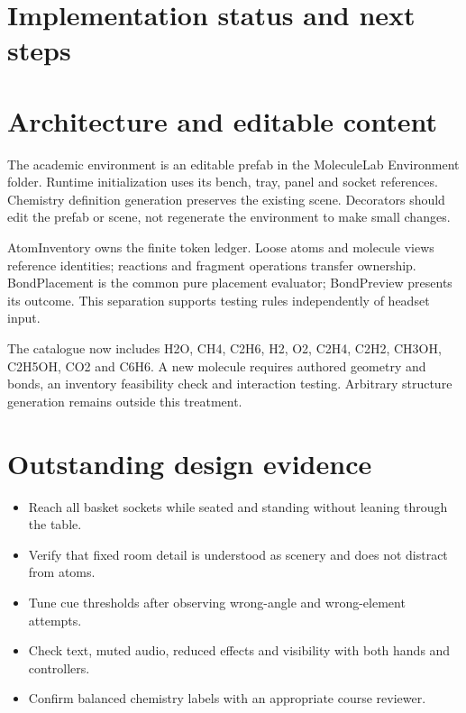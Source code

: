 \section*{Implementation status and next steps}


\section*{Architecture and editable content}
The academic environment is an editable prefab in the MoleculeLab Environment folder. Runtime initialization uses its bench, tray, panel and socket references. Chemistry definition generation preserves the existing scene. Decorators should edit the prefab or scene, not regenerate the environment to make small changes.

AtomInventory owns the finite token ledger. Loose atoms and molecule views reference identities; reactions and fragment operations transfer ownership. BondPlacement is the common pure placement evaluator; BondPreview presents its outcome. This separation supports testing rules independently of headset input.

The catalogue now includes H2O, CH4, C2H6, H2, O2, C2H4, C2H2, CH3OH, C2H5OH, CO2 and C6H6. A new molecule requires authored geometry and bonds, an inventory feasibility check and interaction testing. Arbitrary structure generation remains outside this treatment.

\section*{Outstanding design evidence}
\begin{itemize}
\item Reach all basket sockets while seated and standing without leaning through the table.
\item Verify that fixed room detail is understood as scenery and does not distract from atoms.
\item Tune cue thresholds after observing wrong-angle and wrong-element attempts.
\item Check text, muted audio, reduced effects and visibility with both hands and controllers.
\item Confirm balanced chemistry labels with an appropriate course reviewer.
\end{itemize}


